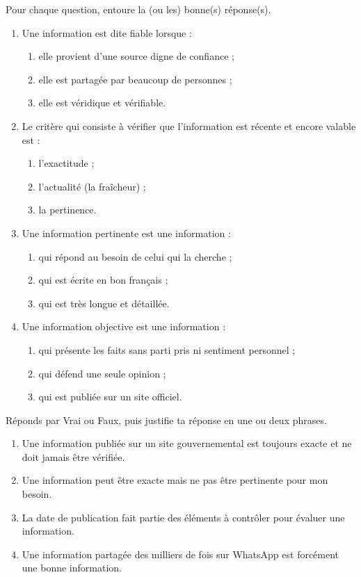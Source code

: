 \documentclass[11pt]{article}
\newcommand{\cle}[1]{{\popxbold\color{popdark}#1}}
\begin{document}
\begin{exercice}
Pour chaque question, entoure la (ou les) bonne(s) réponse(s).
\begin{enumerate}
\item Une information est dite \cle{fiable} lorsque :
\begin{enumerate}
\item elle provient d'une source digne de confiance ;
\item elle est partagée par beaucoup de personnes ;
\item elle est véridique et vérifiable.
\end{enumerate}
\item Le critère qui consiste à vérifier que l'information est récente et encore valable est :
\begin{enumerate}
\item l'exactitude ;
\item l'actualité (la fraîcheur) ;
\item la pertinence.
\end{enumerate}
\item Une information \cle{pertinente} est une information :
\begin{enumerate}
\item qui répond au besoin de celui qui la cherche ;
\item qui est écrite en bon français ;
\item qui est très longue et détaillée.
\end{enumerate}
\item Une information \cle{objective} est une information :
\begin{enumerate}
\item qui présente les faits sans parti pris ni sentiment personnel ;
\item qui défend une seule opinion ;
\item qui est publiée sur un site officiel.
\end{enumerate}
\end{enumerate}
\end{exercice}

\begin{exercice}
Réponds par Vrai ou Faux, puis justifie ta réponse en une ou deux phrases.
\begin{enumerate}
\item Une information publiée sur un site gouvernemental est toujours exacte et ne doit jamais être vérifiée.
\item Une information peut être exacte mais ne pas être pertinente pour mon besoin.
\item La date de publication fait partie des éléments à contrôler pour évaluer une information.
\item Une information partagée des milliers de fois sur WhatsApp est forcément une bonne information.
\end{enumerate}
\end{exercice}
\end{document}
